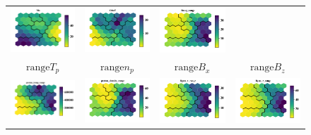 \documentclass[border=0pt,varwidth=18cm,convert={outext=.jpg,density=300}]{standalone}%
\begin{document}
\begin{figure}[h!]
\begin{tabular}{CCCC}
		\includegraphics[width=4cm]{Amaya/comp-map-log_Ma} &
		\includegraphics[width=4cm]{Amaya/comp-map-log_C6to5} &
		\includegraphics[width=4cm]{Amaya/comp-map-log_Bmag_range}\hfill
		\\
		$\text{range} T_p $ & $\text{range} n_p$ & $\text{range} B_x$ & $\text{range} B_z$ \\
		\includegraphics[width=4cm]{Amaya/comp-map-log_proton_temp_range} &
		\includegraphics[width=4cm]{Amaya/comp-map-log_proton_density_range} &
		\includegraphics[width=4cm]{Amaya/comp-map-log_Bgsm_x_range} &
		\includegraphics[width=4cm]{Amaya/comp-map-log_Bgsm_z_range}\hfill

\end{tabular}
\end{figure}
\end{document}
